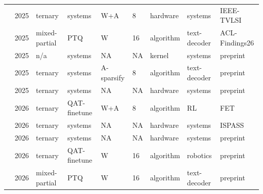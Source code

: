 \begin{landscape}
\begin{longtable}{p{3.2cm} p{1cm} p{1.9cm} p{2.2cm} p{2.2cm} p{1.3cm} p{2.2cm} p{2.1cm} p{2.5cm}}
\citet{Malhotra2025-ReTern} & 2025 & ternary & systems & W+\allowbreak{}A & 8 & hardware & systems & IEEE-TVLSI \\
\citet{Xiao2025-LieQ} & 2025 & mixed-partial & PTQ & W & 16 & algorithm & text-decoder & ACL-Findings26 \\
\citet{Georganas2025-UltraLowBitKernels} & 2025 & n/\allowbreak{}a & systems & NA & NA & kernel & systems & preprint \\
\citet{Qi2025-DeltaLLM} & 2025 & ternary & systems & A-sparsify & 8 & algorithm & text-decoder & preprint \\
\citet{Zhang2025-PDSwap} & 2025 & ternary & systems & NA & NA & hardware & systems & preprint \\
\citet{Sajid2026-BitRL} & 2026 & ternary & QAT-finetune & W+\allowbreak{}A & 8 & algorithm & RL & FET \\
\citet{Geens2026-LUTAccelDesign} & 2026 & ternary & systems & NA & NA & hardware & systems & ISPASS \\
\citet{Lin2026-VitaLLM} & 2026 & ternary & systems & NA & NA & hardware & systems & preprint \\
\citet{Kang2026-BitTP} & 2026 & ternary & QAT-finetune & W & 16 & algorithm & robotics & preprint \\
\citet{Abdalla2026-SAGEPTQ} & 2026 & mixed-partial & PTQ & W & 16 & algorithm & text-decoder & preprint \\
\end{longtable}
\endgroup
\end{landscape}